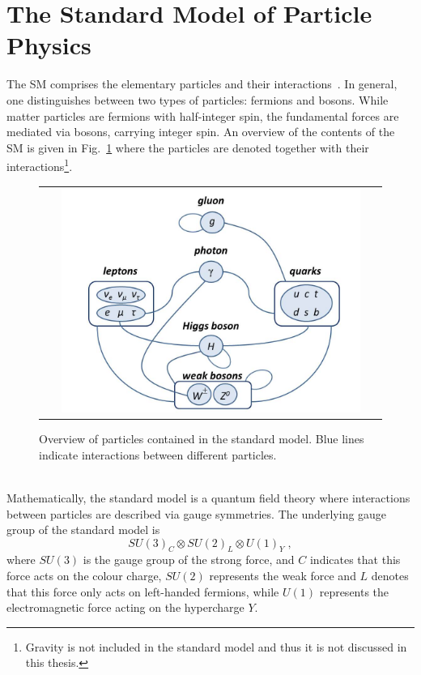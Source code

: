 \section{The Standard Model of Particle Physics}
\label{sec:sm}
The SM comprises the elementary particles and their interactions~\cite{Agashe:2014kda}. In general, one distinguishes between two types of particles: fermions and bosons. While matter particles are fermions with half-integer spin, the fundamental forces are mediated via bosons, carrying integer spin. An overview of the contents of the SM is given in Fig.~\ref{fig:SM} where the particles are denoted together with their interactions\footnote{Gravity is not included in the standard model and thus it is not discussed in this thesis.}. 
\begin{figure}[!tp]
  \centering 
  \begin{tabular}{c}
    \includegraphics[width=0.9\textwidth]{figures/SM.jpg}
  \end{tabular}
  \caption{Overview of particles contained in the standard model. Blue lines indicate interactions between different particles.}
  \label{fig:SM}
\end{figure}
\\
Mathematically, the standard model is a quantum field theory where interactions between particles are described via gauge symmetries. The underlying gauge group of the standard model is 
\begin{equation*}
SU(3)_{C} \otimes SU(2)_{L} \otimes U(1)_{Y} \; ,
\end{equation*}
where $SU(3)$ is the gauge group of the strong force, and $C$ indicates that this force acts on the colour charge, $SU(2)$ represents the weak force and $L$ denotes that this force only acts on left-handed fermions, while $U(1)$ represents the electromagnetic force acting on the hypercharge $Y$.\\
